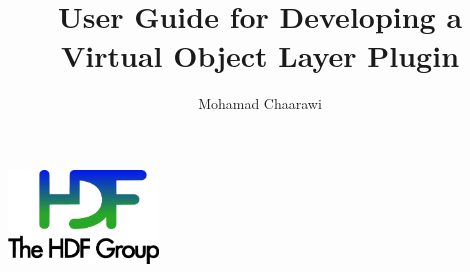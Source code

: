\documentclass[10pt,a4paper]{article}
\title{User Guide for Developing a Virtual Object Layer Plugin}
\author[1]{Mohamad Chaarawi}
\affil[1]{The HDF Group, hdfgroup.org}
\begin{document}
\maketitle
\thispagestyle{empty}

\vfill
\begin{center}
\includegraphics[width=4cm]{THG_LOGO.pdf} %
\end{center}
\vfill
\vfill

\newpage
{}
\tableofcontents
\newpage



\newpage









\end{document}
